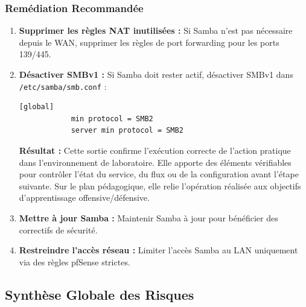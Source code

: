 \documentclass[12pt,a4paper,openany]{report}
\begin{document}
	\subsubsection{Remédiation Recommandée}
	\begin{enumerate}
		\item \textbf{Supprimer les règles NAT inutilisées :} Si Samba n'est pas nécessaire depuis le WAN, supprimer les règles de port forwarding pour les ports 139/445.
		\item \textbf{Désactiver SMBv1 :} Si Samba doit rester actif, désactiver SMBv1 dans \texttt{/etc/samba/smb.conf} :
		\begin{lstlisting}[caption=Désactivation SMBv1 dans Samba]
			[global]
			min protocol = SMB2
			server min protocol = SMB2
		\end{lstlisting}
		
		\textbf{Résultat :} Cette sortie confirme l'exécution correcte de l'action pratique dans l'environnement de laboratoire. Elle apporte des éléments vérifiables pour contrôler l'état du service, du flux ou de la configuration avant l'étape suivante. Sur le plan pédagogique, elle relie l'opération réalisée aux objectifs d'apprentissage offensive/défensive.
		
		\item \textbf{Mettre à jour Samba :} Maintenir Samba à jour pour bénéficier des correctifs de sécurité.
		\item \textbf{Restreindre l'accès réseau :} Limiter l'accès Samba au LAN uniquement via des règles pfSense strictes.
	\end{enumerate}
	
	\subsection{Synthèse Globale des Risques}
	
\end{document}
